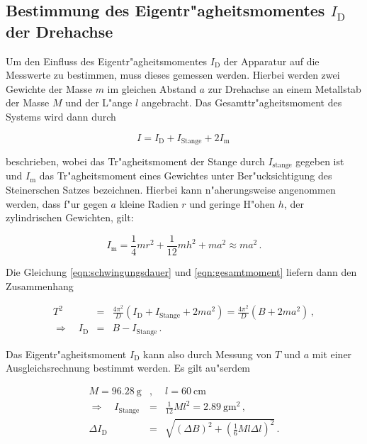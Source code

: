 	\subsection{Bestimmung des Eigentr"agheitsmomentes $I_\mathrm{D}$ der Drehachse}
	\label{subsec:eigentraegheitsmoment}
		Um den Einfluss des Eigentr"agheitsmomentes $I_\mathrm{D}$ der Apparatur auf die Messwerte zu bestimmen, muss dieses gemessen werden.
		Hierbei werden zwei Gewichte der Masse $m$ im gleichen Abstand $a$ zur Drehachse an einem Metallstab der Masse $M$ und der L"ange $l$ angebracht.
		Das Gesamttr"agheitsmoment des Systems wird dann durch

		\begin{equation}
			I = I_\mathrm{D} + I_\mathrm{Stange} + 2 I_\mathrm{m} \, \label{eqn:gesamtmoment}
		\end{equation}

		beschrieben, wobei das Tr"agheitsmoment der Stange durch $I_\mathrm{stange}$ gegeben ist und $I_\mathrm{m}$ das Tr"agheitsmoment eines Gewichtes unter Ber"ucksichtigung des Steinerschen Satzes bezeichnen.
		Hierbei kann n"aherungsweise angenommen werden, dass f"ur gegen $a$ kleine Radien $r$ und geringe H"ohen $h$, der zylindrischen Gewichten, gilt:

		\begin{equation*}
			I_\mathrm{m} = \frac{1}{4}mr^2 + \frac{1}{12}mh^2 + ma^2 \approx ma^2 \,.
		\end{equation*}

		Die Gleichung \eqref{eqn:schwingungsdauer} und \eqref{eqn:gesamtmoment} liefern dann den Zusammenhang

		\begin{eqnarray*}
			T^2 & = & \frac{4 \pi^2}{D} \left(I_\mathrm{D} + I_\mathrm{Stange} + 2ma^2 \right) = \frac{4 \pi^2}{D} \left(B  + 2ma^2 \right) \,, \\
			\Rightarrow \quad I_\mathrm{D} & = & B - I_\mathrm{Stange} \,.
		\end{eqnarray*}

		Das Eigentr"agheitsmoment $I_\mathrm{D}$ kann also durch Messung von $T$ und $a$ mit einer Ausgleichsrechnung bestimmt werden. Es gilt au"serdem

		\begin{eqnarray*}
			M = \SI{96.28}{\gram} &,& l = \SI{60}{\centi \meter} \\
			\Rightarrow \quad I_\mathrm{Stange} & = & \frac{1}{12} M l^2 = \SI{2.89}{\gram \meter \squared} \,, \\
			\Delta I_\mathrm{D} & = & \sqrt{\left(\Delta B\right)^2 + \left(\frac{1}{6}Ml \Delta l \right)^2} \,.
		\end{eqnarray*}

